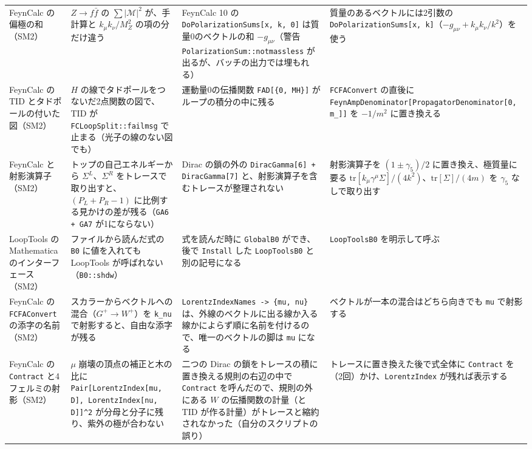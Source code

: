 \documentclass[a4paper,10pt]{ltjsarticle}
\newcommand{\bq}{\textasciigrave}
\begin{document}
\begin{table}[tbp]
\begin{tabularx}{\linewidth}{>{\raggedright\arraybackslash}p{2.4cm}>{\raggedright\arraybackslash}X>{\raggedright\arraybackslash}X>{\raggedright\arraybackslash}X}
FeynCalc の偏極の和（SM2） & $Z\to f\bar f$ の $\sum|\mathcal M|^2$ が、手計算と $k_\mu k_\nu/M_Z^2$ の項の分だけ違う & FeynCalc 10 の \texttt{DoPolarizationSums[x, k, 0]} は質量0のベクトルの和 $-g_{\mu\nu}$（警告 \texttt{PolarizationSum::notmassless} が出るが、バッチの出力では埋もれる） & 質量のあるベクトルには2引数の \texttt{DoPolarizationSums[x, k]}（$-g_{\mu\nu}+k_\mu k_\nu/k^2$）を使う \\
FeynCalc の TID とタドポールの付いた図（SM2） & $H$ の線でタドポールをつないだ2点関数の図で、TID が \texttt{FCLoopSplit::failmsg} で止まる（光子の線のない図でも） & 運動量0の伝播関数 \texttt{FAD[\{0, MH\}]} がループの積分の中に残る & \texttt{FCFAConvert} の直後に \texttt{FeynAmpDenominator[}\allowbreak\texttt{PropagatorDenominator[0, m\_]]} を $-1/m^2$ に置き換える \\
FeynCalc と射影演算子（SM2） & トップの自己エネルギーから $\Sigma^L$、$\Sigma^R$ をトレースで取り出すと、$(P_L+P_R-1)$ に比例する見かけの差が残る（\texttt{GA6 + GA7} が1にならない） & Dirac の鎖の外の \texttt{DiracGamma[6] + DiracGamma[7]} と、射影演算子を含むトレースが整理されない & 射影演算子を $(1\pm\gamma_5)/2$ に置き換え、極質量に要る $\mathrm{tr}[k_\mu\gamma^\mu\Sigma]/(4k^2)$、$\mathrm{tr}[\Sigma]/(4m)$ を $\gamma_5$ なしで取り出す \\
LoopTools の Mathematica のインターフェース（SM2） & ファイルから読んだ式の \texttt{B0} に値を入れても LoopTools が呼ばれない（\texttt{B0::shdw}） & 式を読んだ時に \texttt{Global\bq B0} ができ、後で \texttt{Install} した \texttt{LoopTools\bq B0} と別の記号になる & \texttt{LoopTools\bq B0} を明示して呼ぶ \\
FeynCalc の \texttt{FCFAConvert} の添字の名前（SM2） & スカラーからベクトルへの混合（$G^+\to W^+$）を \texttt{k\_nu} で射影すると、自由な添字が残る & \texttt{LorentzIndexNames -> \{mu, nu\}} は、外線のベクトルに出る線か入る線かによらず順に名前を付けるので、唯一のベクトルの脚は \texttt{mu} になる & ベクトルが一本の混合はどちら向きでも \texttt{mu} で射影する \\
FeynCalc の \texttt{Contract} と4フェルミの射影（SM2） & $\mu$ 崩壊の頂点の補正と木の比に \texttt{Pair[LorentzIndex[mu, D], LorentzIndex[nu, D]]\^{}2} が分母と分子に残り、紫外の極が合わない & 二つの Dirac の鎖をトレースの積に置き換える規則の右辺の中で \texttt{Contract} を呼んだので、規則の外にある $W$ の伝播関数の計量（と TID が作る計量）がトレースと縮約されなかった（自分のスクリプトの誤り） & トレースに置き換えた後で式全体に \texttt{Contract} を（2回）かけ、\texttt{LorentzIndex} が残れば表示する \\

\end{tabularx}
\end{table}
\end{document}
